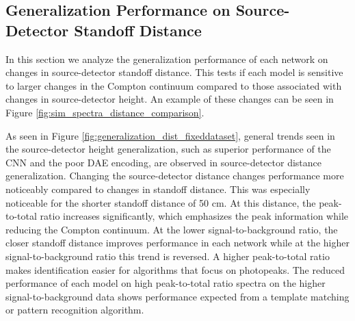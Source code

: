 \subsection{Generalization Performance on Source-Detector Standoff Distance}

In this section we analyze the generalization performance of each network on changes in source-detector standoff distance. This tests if each model is sensitive to larger changes in the Compton continuum compared to those associated with changes in source-detector height. An example of these changes can be seen in Figure \ref{fig:sim_spectra_distance_comparison}.

As seen in Figure \ref{fig:generalization_dist_fixeddataset}, general trends seen in the source-detector height generalization, such as superior performance of the CNN and the poor DAE encoding, are observed in source-detector distance generalization. Changing the source-detector distance changes performance more noticeably compared to changes in standoff distance. This was especially noticeable for the shorter standoff distance of 50 cm. At this distance, the peak-to-total ratio increases significantly, which emphasizes the peak information while reducing the Compton continuum. At the lower signal-to-background ratio, the closer standoff distance improves performance in each network while at the higher signal-to-background ratio this trend is reversed. A higher peak-to-total ratio makes identification easier for algorithms that focus on photopeaks. The reduced performance of each model on high peak-to-total ratio spectra on the higher signal-to-background data shows performance expected from a template matching or pattern recognition algorithm.


